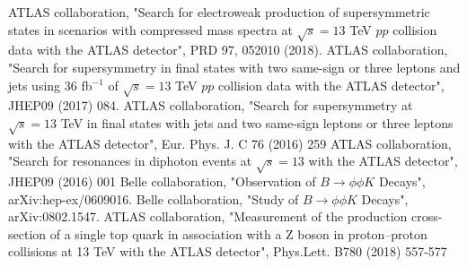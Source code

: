 \documentclass[12pt]{article}
\begin{document}
\begin{thebibliography}{999}
 ATLAS collaboration, "Search for electroweak production of supersymmetric states in scenarios with compressed mass spectra at $\sqrt{s} = 13$ TeV $pp$ collision data with the ATLAS detector", PRD 97, 052010 (2018).
 ATLAS collaboration, "Search for supersymmetry in final states with two same-sign or three leptons and jets using 36 fb$^{-1}$ of $\sqrt{s} = 13$ TeV $pp$ collision data with the ATLAS detector", JHEP09 (2017) 084.
 ATLAS collaboration, "Search for supersymmetry at $\sqrt{s} = 13$ TeV in final states with jets and two same-sign leptons or three leptons with the ATLAS detector", Eur. Phys. J. C 76 (2016) 259
 ATLAS collaboration, "Search for resonances in diphoton events at $\sqrt{s} = 13$ with the ATLAS detector", JHEP09 (2016) 001
 Belle collaboration, "Observation of $B \to \phi \phi K$ Decays", arXiv:hep-ex/0609016.
 Belle collaboration, "Study of $B \to \phi \phi K$ Decays", arXiv:0802.1547.
ATLAS collaboration, "Measurement of the production cross-section of a single top quark in association with a Z boson in proton–proton collisions at 13 TeV with the ATLAS detector", Phys.Lett. B780 (2018) 557-577
\end{thebibliography}
\end{document}
